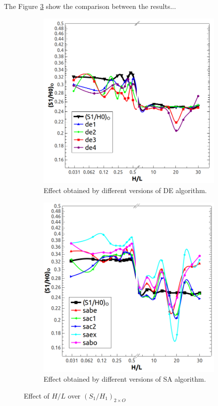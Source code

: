 \documentclass[10pt,fleqn,a4paper,twoside]{article}
\begin{document}
The Figure \ref{figure07} show the comparison between the results...

\begin{figure}[h!]
\centering
	\begin{subfigure}{0.52\textwidth}
		\centering
		\includegraphics[width=1\linewidth]{imgs/de/g_hl_s1h0_1.png}
		\caption{ {\small Effect obtained by different versions of DE algorithm.}}
		\label{figure07:sub1}
	\end{subfigure}%
	\begin{subfigure}{0.52\textwidth}
		\centering
		\includegraphics[width=1\linewidth]{imgs/sa/g_hl_s1h0_1.png}
		\caption{ {\small Effect obtained by different versions of SA algorithm.}}
		\label{figure07:sub2}
	\end{subfigure}%
\caption{Effect of $H/L$ over ${(S_{1}/H_{1})_{2\times O}}$}
\label{figure07}
\end{figure}
\end{document}
